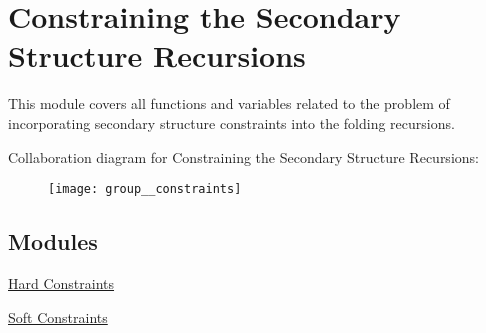 \hypertarget{group__constraints}{}\section{Constraining the Secondary Structure Recursions}
\label{group__constraints}


This module covers all functions and variables related to the problem of incorporating secondary structure constraints into the folding recursions.  


Collaboration diagram for Constraining the Secondary Structure Recursions\+:
\nopagebreak
\begin{figure}[H]
\begin{center}
\leavevmode
\texttt{[image: group\_\_constraints]}
\end{center}
\end{figure}
\subsection*{Modules}
\begin{DoxyCompactItemize}
\item 
\hyperlink{group__hard__constraints}{Hard Constraints}
\item 
\hyperlink{group__soft__constraints}{Soft Constraints}
\end{DoxyCompactItemize}

